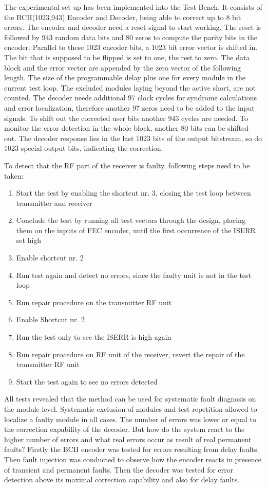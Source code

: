 The experimental set-up has been implemented into the Test Bench. It consists of the BCH(1023,943) Encoder and Decoder, being able to correct up to 8 bit errors. The encoder and decoder need a reset signal to start working. The reset is followed by 943 random data bits and 80 zeros to compute the parity bits in the encoder. Parallel to these 1023 encoder bits, a 1023 bit error vector is shifted in. The bit that is supposed to be flipped is set to one, the rest to zero. The data block and the error vector are appended by the zero vector of the following length. The size of the programmable delay plus one for every module in the current test loop. The excluded modules laying beyond the active short, are not counted. The decoder needs additional 97 clock cycles for syndrome calculations and error localization, therefore another 97 zeros need to be added to the input signals. To shift out the corrected user bits another 943 cycles are needed. To monitor the error detection in the whole block, another 80 bits can be shifted out. The decoder response lies in the last 1023 bits of the output bitstream, so do 1023 special output bits, indicating the correction.

To detect that the RF part of the receiver is faulty, following steps need to be taken:
\begin{enumerate}
    \item Start the test by enabling the shortcut nr. 3, closing the test loop between transmitter and receiver
    \item Conclude the test by running all test vectors through the design, placing them on the inputs of FEC encoder, until the first occurrence of the ISERR set high
    \item Enable shortcut nr. 2
    \item Run test again and detect no errors, since the faulty unit is not in the test loop
    \item Run repair procedure on the transmitter RF unit
    \item Enable Shortcut nr. 2
    \item Run the test only to see the ISERR is high again
    \item Run repair procedure on RF unit of the receiver, revert the repair of the transmitter RF unit
    \item Start the test again to see no errors detected
\end{enumerate}

All tests revealed that the method can be used for systematic fault diagnosis on the module level. Systematic exclusion of modules and test repetition allowed to localize a faulty module in all cases. The number of errors was lower or equal to the correction capability of the decoder. But how do the system react to the higher number of errors and what real errors occur as result of real permanent faults? Firstly the BCH encoder was tested for errors resulting from delay faults. Then fault injection was conducted to observe how the encoder reacts in presence of transient and permanent faults. Then the decoder was tested for error detection above its maximal correction capability and also for delay faults.

